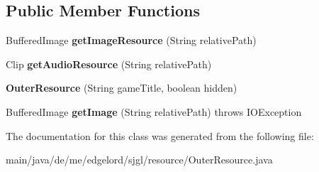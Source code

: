 \subsection*{Public Member Functions}
\begin{DoxyCompactItemize}
\item 
\mbox{\label{classde_1_1me_1_1edgelord_1_1sjgl_1_1resource_1_1_outer_resource_ad7c2c4225f33514b3a3279358c09908b}} 
Buffered\+Image {\bfseries get\+Image\+Resource} (String relative\+Path)
\item 
\mbox{\label{classde_1_1me_1_1edgelord_1_1sjgl_1_1resource_1_1_outer_resource_a90c8658998f4674e5f8bf0c42a153270}} 
Clip {\bfseries get\+Audio\+Resource} (String relative\+Path)
\item 
\mbox{\label{classde_1_1me_1_1edgelord_1_1sjgl_1_1resource_1_1_outer_resource_aad0bd13d64d1550e775a9ec712ca751b}} 
{\bfseries Outer\+Resource} (String game\+Title, boolean hidden)
\item 
\mbox{\label{classde_1_1me_1_1edgelord_1_1sjgl_1_1resource_1_1_outer_resource_a582e52e5ee18555d29d7d7432b2799d0}} 
Buffered\+Image {\bfseries get\+Image} (String relative\+Path)  throws I\+O\+Exception 
\end{DoxyCompactItemize}


The documentation for this class was generated from the following file\+:\begin{DoxyCompactItemize}
\item 
main/java/de/me/edgelord/sjgl/resource/Outer\+Resource.\+java\end{DoxyCompactItemize}
